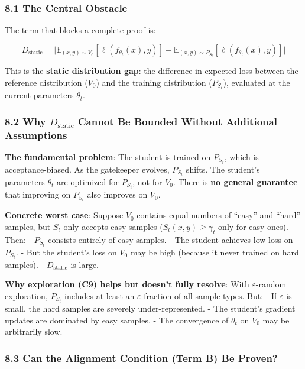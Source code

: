 \documentclass[
  12pt,
]{ctexart}
\begin{document}
\subsubsection{8.1 The Central Obstacle}\label{the-central-obstacle}

The term that blocks a complete proof is:

\[\boxed{\;D_{\text{static}} = \bigl|\mathbb{E}_{(x,y) \sim V_0}[\ell(f_{\theta_t}(x), y)] - \mathbb{E}_{(x,y) \sim P_{S_t}}[\ell(f_{\theta_t}(x), y)]\bigr|\;}\]

This is the \textbf{static distribution gap}: the difference in expected
loss between the reference distribution (\(V_0\)) and the training
distribution (\(P_{S_t}\)), evaluated at the current parameters
\(\theta_t\).

\subsubsection{\texorpdfstring{8.2 Why \(D_{\text{static}}\) Cannot Be
Bounded Without Additional
Assumptions}{8.2 Why D\_\{\textbackslash text\{static\}\} Cannot Be Bounded Without Additional Assumptions}}\label{why-d_textstatic-cannot-be-bounded-without-additional-assumptions}

\textbf{The fundamental problem}: The student is trained on \(P_{S_t}\),
which is acceptance-biased. As the gatekeeper evolves, \(P_{S_t}\)
shifts. The student's parameters \(\theta_t\) are optimized for
\(P_{S_t}\), not for \(V_0\). There is \textbf{no general guarantee}
that improving on \(P_{S_t}\) also improves on \(V_0\).

\textbf{Concrete worst case}: Suppose \(V_0\) contains equal numbers of
``easy'' and ``hard'' samples, but \(S_t\) only accepts easy samples
(\(S_t(x,y) \geq \gamma_t\) only for easy ones). Then: - \(P_{S_t}\)
consists entirely of easy samples. - The student achieves low loss on
\(P_{S_t}\). - But the student's loss on \(V_0\) may be high (because it
never trained on hard samples). - \(D_{\text{static}}\) is large.

\textbf{Why exploration (C9) helps but doesn't fully resolve}: With
\(\varepsilon\)-random exploration, \(P_{S_t}\) includes at least an
\(\varepsilon\)-fraction of all sample types. But: - If \(\varepsilon\)
is small, the hard samples are severely under-represented. - The
student's gradient updates are dominated by easy samples. - The
convergence of \(\theta_t\) on \(V_0\) may be arbitrarily slow.

\subsubsection{8.3 Can the Alignment Condition (Term B) Be
Proven?}\label{can-the-alignment-condition-term-b-be-proven}
\end{document}

